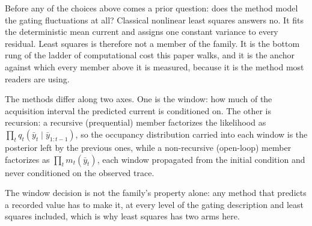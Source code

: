 Before any of the choices above comes a prior question: does the method model the gating
fluctuations at all? Classical nonlinear least squares answers no. It fits
the deterministic mean current and assigns one constant variance to every residual. Least squares is
therefore not a member of the family. It is the bottom rung of the ladder of computational
cost this paper walks, and it is the anchor against which every member above it is
measured, because it is the method most readers are using.

The methods differ along two axes. One is the window: how much of the acquisition interval the
predicted current is conditioned on. The other is recursion: a recursive (prequential) member \citep{dawid1984present}
factorizes the likelihood as $\prod_t q_t(\bar{y}_t \mid \bar{y}_{1:t-1})$, so the occupancy
distribution carried into each window is the posterior left by the previous ones, while a
non-recursive (open-loop) member factorizes as $\prod_t m_t(\bar{y}_t)$, each window propagated
from the initial condition and never conditioned on the observed trace.

The window decision is not the family's property alone: any method that predicts a recorded value
has to make it, at every level of the gating description and least squares included, which is why
least squares has two arms here.

